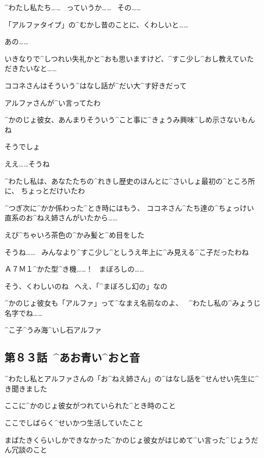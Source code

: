 \page[79]
\Kokone ^{わたし}{私}たち……
\ っていうか……
\ その……

\Kokone 「アルファタイプ」の^{むかし}{昔}のことに、くわしいと……

\Kokone あの……

\Kokone いきなりで^{しつれい}{失礼}かと^{おも}{思}いますけど、^{すこ}{少}し^{おし}{教}えていただきたいなと……

\Sensei ココネさんはそういう^{はなし}{話}が^{だい}{大}^{す}{好}きだって

\Sensei アルファさんが^{い}{言}ってたわ

\page[80]
\Sensei ^{かのじょ}{彼女}、あんまりそういう^{こと}{事}に^{きょうみ}{興味}^{しめ}{示}さないもんね

\Sensei そうでしょ

\Sensei ええ……そうね

\Sensei ^{わたし}{私}は、あなたたちの^{れきし}{歴史}のほんとに^{さいしょ}{最初}の^{ところ}{所}に、
ちょっとだけいたわ

\Sensei ^{つぎ}{次}に^{かか}{係}わった^{とき}{時}にはもう、
ココネさん^{たち}{達}の^{ちょっけい}{直系}のお^{ねえ}{姉}さんがいたから……

\page[81]
\Sensei えび^{ちゃいろ}{茶色}の^{かみ}{髪}と^{め}{目}をした

\Sensei そうね……
\ みんなより^{すこ}{少}し^{としうえ}{年上}に^{み}{見}える^{こ}{子}だったわね

\Kokone Ａ７Ｍ１^{かた}{型}^{き}{機}……！
\ まぼろしの……

\Sensei そう、くわしいのね
\ へえ、「^{まぼろし}{幻}の」なの

\page[82]
\Sensei ^{かのじょ}{彼女}も「アルファ」って^{なまえ}{名前}なのよ、
\ ^{わたし}{私}の^{みょうじ}{名字}でね……

\Sensei ^{こ}{子}^{うみ}{海}^{いし}{石}アルファ


\subsection{第８３話\ ^{あお}{青}い^{おと}{音}}

\page[84]
\Kokone ^{わたし}{私}とアルファさんの「お^{ねえ}{姉}さん」の^{はなし}{話}を^{せんせい}{先生}に^{き}{聞}きました

\Kokone ここに^{かのじょ}{彼女}がつれていられた^{とき}{時}のこと

\Kokone ここでしばらく^{せいかつ}{生活}していたこと

\page[85]
\Kokone まばたきくらいしかできなかった^{かのじょ}{彼女}がはじめて^{い}{言}った^{じょうだん}{冗談}のこと

